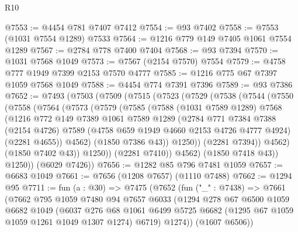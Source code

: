 \begin{lexlean}{R10}
\begin{coremodule}
@7553 := @4454 @781 @7407 @7412
@7554 := @93 @7402
@7558 := @7553 (@1031 @7554 @1289) @7533
@7564 := @1216 @779 @149 @7405 @1061 @7554 @1289
@7567 := @2784 @778 @7400 @7404
@7568 := @93 @7394
@7570 := @1031 @7568 @1049
@7573 := @7567 (@2154 @7570) @7554
@7579 := @4758 @777 @1949 @7399 @2153 @7570 @4777
@7585 := @1216 @775 @67 @7397 @1059 @7568 @1049
@7588 := @4454 @774 @7391 @7396
@7589 := @93 @7386
@7652 := @7493
    (@7503
      (@7509
        (@7515
          (@7523
            (@7529
              (@7538
                (@7544
                  (@7550
                    (@7558
                      (@7564
                        (@7573
                          (@7579
                            (@7585
                              (@7588
                                (@1031 @7589 @1289)
                                @7568
                                (@1216
                                  @772
                                  @149
                                  @7389
                                  @1061
                                  @7589
                                  @1289
                                  (@2784
                                    @771
                                    @7384
                                    @7388
                                    (@2154 @4726)
                                    @7589
                                    (@4758 @659 @1949 @4660 @2153 @4726 @4777 @4924)
                                    (@2281 @4655))
                                  @4562)
                                (@1850 @7386 @43))
                              @1250))
                          (@2281 @7394))
                        @4562)
                      (@1850 @7402 @43))
                    @1250))
                (@2281 @7410))
              @4562)
            (@1850 @7418 @43))
          @1250))
      (@6029 @7426))
@7656 := @1282 @85 @796 @7481 @1059
@7657 := @6683 @1049
@7661 := @7656 (@1208 @7657) (@1110 @7488)
@7662 := @1294 @95
@7711 := fun (a : @30) =>
  @7475
    (@7652
      (fun ("_" : @7438) =>
      @7661
        (@7662
          @795
          @1059
          @7480
          @94
          @7657
          @6033
          (@1294
            @278
            @67
            @6500
            @1059
            @6682
            @1049
            (@6037
              @276
              @68
              @1061
              @6499
              @5725
              @6682
              (@1295 @67 @1059 @1059 @1261 @1049 @1307 @1274)
              @6719)
            @1274))
        (@1607 @6506))

\end{coremodule}
\end{lexlean}
